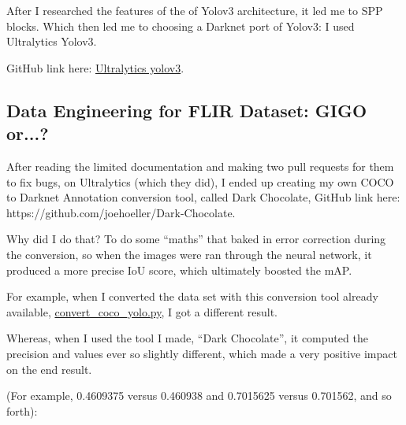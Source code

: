 \documentclass[oneside]{article}
\begin{document}
After I researched the features of the of Yolov3 architecture, it led me to SPP blocks. Which then led me to choosing a Darknet port of Yolov3: I used Ultralytics Yolov3. 

GitHub link here: \href{https://github.com/ultralytics/yolov3}{Ultralytics yolov3}.

\subsection{Data Engineering for FLIR Dataset: GIGO or...?}
After reading the limited documentation and making two pull requests for them to fix bugs, on Ultralytics (which they did), I ended up creating my own COCO to Darknet Annotation conversion tool, called Dark Chocolate, GitHub link here: https://github.com/joehoeller/Dark-Chocolate.

Why did I do that? To do some “maths” that baked in error correction during the conversion, so when the images were ran through the neural network, it produced a more precise IoU score, which ultimately boosted the mAP.


For example, when I converted the data set with this conversion tool already available, \href{https://github.com/enesozi/object-detection/blob/master/convert\_coco_yolo.py}{convert\_coco\_yolo.py}, I got a different result.\

Whereas, when I used the tool I made, “Dark Chocolate”, it computed the precision and values ever so slightly different, which made a very positive impact on the end result.

(For example, 0.4609375 versus 0.460938 and 0.7015625 versus 0.701562,
and so forth):
\end{document}
